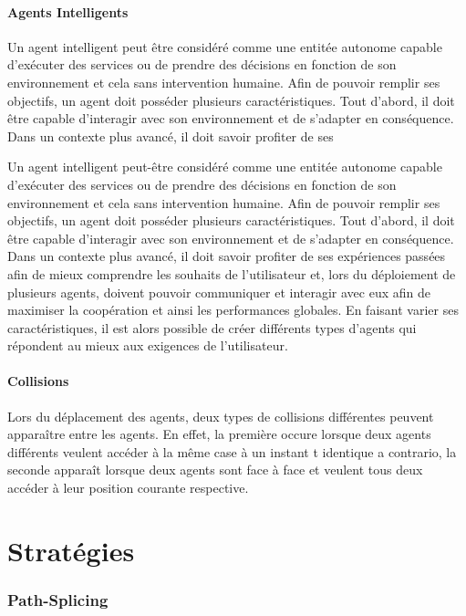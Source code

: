 \documentclass[a4paper, twocolumn]{article}
\begin{document}
		\subsection{Agents Intelligents}
		Un agent intelligent peut être considéré comme une entitée autonome capable d'exécuter des services ou de prendre des décisions en fonction de son environnement et cela sans intervention humaine. Afin de pouvoir remplir ses objectifs, un agent doit posséder plusieurs caractéristiques. Tout d'abord, il doit être capable d'interagir avec son environnement et de s'adapter en conséquence. Dans un contexte plus avancé, il doit savoir profiter de ses 
		
		Un agent intelligent peut-être considéré comme une entitée autonome capable d'exécuter des services ou de prendre des décisions en fonction de son environnement et cela sans intervention humaine. Afin de pouvoir remplir ses objectifs, un agent doit posséder plusieurs caractéristiques. Tout d'abord, il doit être capable d'interagir avec son environnement et de s'adapter en conséquence. Dans un contexte plus avancé, il doit savoir profiter de ses expériences passées afin de mieux comprendre les souhaits de l'utilisateur et, lors du déploiement de plusieurs agents, doivent pouvoir communiquer et interagir avec eux afin de maximiser la coopération et ainsi les performances globales. En faisant varier ses caractéristiques, il est alors possible de créer différents types d'agents qui répondent au mieux aux exigences de l'utilisateur.
		
		\subsection{Collisions}
		Lors du déplacement des agents, deux types de collisions différentes peuvent apparaître entre les agents. En effet, la première occure lorsque deux agents différents veulent accéder à la même case à un instant t identique a contrario, la seconde apparaît lorsque deux agents sont face à face et veulent tous deux accéder à leur position courante respective.
		
	\setcounter{section}{0}
	\part{Stratégies}

		\section{Path-Splicing}
\end{document}
